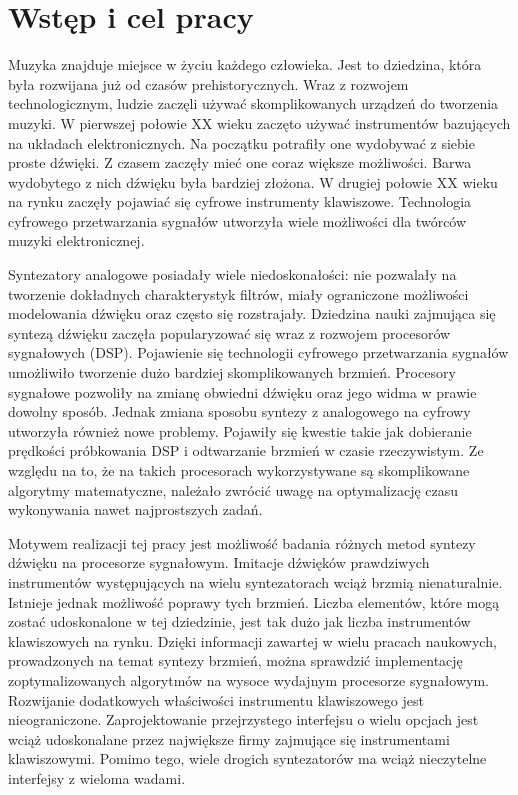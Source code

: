 \chapter{Wstęp i cel pracy}
Muzyka znajduje miejsce w życiu każdego człowieka. Jest to dziedzina, która była rozwijana już od czasów prehistorycznych. Wraz z rozwojem technologicznym, ludzie zaczęli używać skomplikowanych urządzeń do tworzenia muzyki. W pierwszej połowie XX wieku zaczęto używać instrumentów bazujących na układach elektronicznych. Na początku potrafiły one wydobywać z siebie proste dźwięki. Z czasem zaczęły mieć one coraz większe możliwości. Barwa wydobytego z nich dźwięku była bardziej złożona. W drugiej połowie XX wieku na rynku zaczęły pojawiać się cyfrowe instrumenty klawiszowe. Technologia cyfrowego przetwarzania sygnałów utworzyła wiele możliwości dla twórców muzyki elektronicznej.

Syntezatory analogowe posiadały wiele niedoskonałości: nie pozwalały na tworzenie  dokładnych charakterystyk filtrów, miały ograniczone możliwości modelowania dźwięku oraz często się rozstrajały. Dziedzina nauki zajmująca się syntezą dźwięku zaczęła popularyzować się wraz z rozwojem procesorów sygnałowych (DSP). Pojawienie się technologii cyfrowego przetwarzania sygnałów umożliwiło tworzenie dużo bardziej skomplikowanych brzmień. Procesory sygnałowe pozwoliły na zmianę obwiedni dźwięku oraz jego widma w prawie dowolny sposób. Jednak zmiana sposobu syntezy z analogowego na cyfrowy utworzyła również nowe problemy. Pojawiły się kwestie takie jak dobieranie prędkości próbkowania DSP i odtwarzanie brzmień w czasie rzeczywistym. Ze względu na to, że na takich procesorach wykorzystywane są skomplikowane algorytmy matematyczne, należało zwrócić uwagę na optymalizację czasu wykonywania nawet najprostszych zadań.

Motywem realizacji tej pracy jest możliwość badania różnych metod syntezy dźwięku na procesorze sygnałowym. Imitacje dźwięków prawdziwych instrumentów występujących na wielu syntezatorach wciąż brzmią nienaturalnie. Istnieje jednak możliwość poprawy tych brzmień. Liczba elementów, które mogą zostać udoskonalone w tej dziedzinie, jest tak dużo jak liczba instrumentów klawiszowych na rynku. Dzięki informacji zawartej w wielu pracach naukowych, prowadzonych na temat syntezy brzmień, można sprawdzić implementację zoptymalizowanych algorytmów na wysoce wydajnym procesorze sygnałowym. Rozwijanie dodatkowych właściwości instrumentu klawiszowego jest nieograniczone. Zaprojektowanie przejrzystego interfejsu o wielu opcjach jest wciąż udoskonalane przez największe firmy zajmujące się instrumentami klawiszowymi. Pomimo tego, wiele drogich syntezatorów ma wciąż nieczytelne interfejsy z wieloma wadami.

